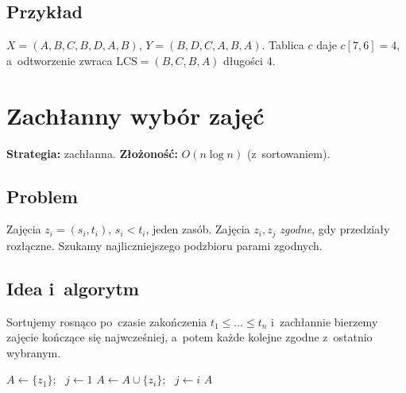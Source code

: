 \documentclass[11pt,a4paper]{article}
\theoremstyle{plain}
\theoremstyle{definition}
\begin{document}
\subsection*{Przykład}
$X=(A,B,C,B,D,A,B)$, $Y=(B,D,C,A,B,A)$. Tablica $c$ daje $c[7,6]=4$, a~odtworzenie zwraca
$\mathrm{LCS}=(B,C,B,A)$ długości $4$.

\section{Zachłanny wybór zajęć}\label{sec:activity}
\textbf{Strategia:} zachłanna. \quad\textbf{Złożoność:} $O(n\log n)$ (z~sortowaniem).

\subsection*{Problem}
Zajęcia $z_i=(s_i,t_i)$, $s_i<t_i$, jeden zasób. Zajęcia $z_i,z_j$ \emph{zgodne}, gdy przedziały
rozłączne. Szukamy najliczniejszego podzbioru parami zgodnych.

\subsection*{Idea i~algorytm}
Sortujemy rosnąco po~czasie zakończenia $t_1\le\dots\le t_n$ i~zachłannie bierzemy zajęcie kończące się
najwcześniej, a~potem każde kolejne zgodne z~ostatnio wybranym.
\begin{algorithm}[H]
\caption{Activity-Selection($s,t$) (po posortowaniu wg $t$)}
\begin{algorithmic}[1]
\State $A\gets\{z_1\}$; \ $j\gets 1$
   $A\gets A\cup\{z_i\}$; \ $j\gets i$ \EndIf
\EndFor
\State \Return $A$
\end{algorithmic}
\end{algorithm}
\end{document}
